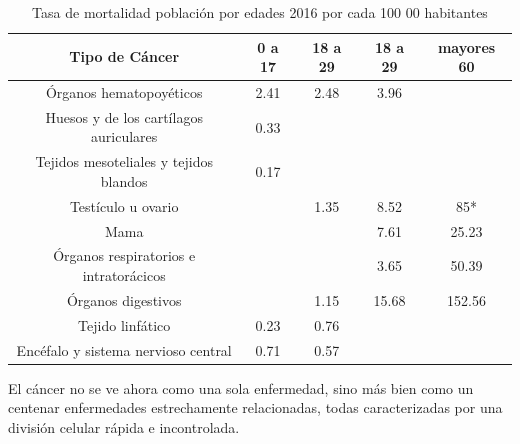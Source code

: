 \documentclass[]{article}
\begin{document}
\begin{table}[h!]	
	\centering
	\begin{tabular}{||c|c|c|c|c||}
		\hline
		\textbf{Tipo de Cáncer }      & \textbf{0 a 17} & \textbf{18 a 29} & \textbf{18 a 29} & \textbf{mayores 60} \\ \hline\hline
			Órganos hematopoyéticos                & 2.41 & 2.48 & 3.96 &   \\ 
			Huesos y de los cartílagos auriculares & 0.33 &      &      &     \\ 
			Tejidos mesoteliales y tejidos blandos & 0.17 &      &      &     \\ 
			Testículo u ovario                     &      & 1.35 & 8.52 & 85*    \\ 
			Mama                                   &      &      & 7.61 & 25.23 \\ 
		    Órganos respiratorios e intratorácicos &      &      & 3.65 & 50.39 \\ 
			Órganos digestivos                     &      & 1.15 & 15.68& 152.56     \\ 
			Tejido linfático                       & 0.23 & 0.76 &      & \\ 
			Encéfalo y sistema nervioso central    & 0.71 & 0.57 &      &  \\ \hline 
	\end{tabular}
\caption{Tasa de mortalidad población por edades 2016 por cada 100 00 habitantes \citep{InstitutoNacionalDeEstadisticayGeografia2018}}
\label{mortandadCancer}
\end{table}

El cáncer no se ve ahora como una sola enfermedad, sino más bien como un centenar enfermedades estrechamente relacionadas, todas caracterizadas por una división celular rápida e incontrolada.\\
\end{document}
